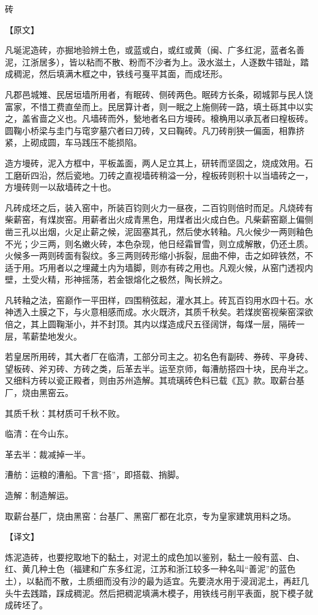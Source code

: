 \documentclass[12pt,UTF8]{ctexbook}
\begin{document}
砖

【原文】

凡埏泥造砖，亦掘地验辨土色，或蓝或白，或红或黄（闽、广多红泥，蓝者名善泥，江浙居多），皆以粘而不散、粉而不沙者为上。汲水滋土，人逐数牛错趾，踏成稠泥，然后填满木框之中，铁线弓戛平其面，而成坯形。

凡郡邑城雉、民居垣墙所用者，有眠砖、侧砖两色。眠砖方长条，砌城郭与民人饶富家，不惜工费直垒而上。民居算计者，则一眠之上施侧砖一路，填土砾其中以实之，盖省啬之义也。凡墙砖而外，甃地者名曰方墁砖。榱桷用以承瓦者曰楻板砖。圆鞠小桥梁与圭门与窀穸墓穴者曰刀砖，又曰鞠砖。凡刀砖削狭一偏面，相靠挤紧，上砌成圆，车马践压不能损陷。

造方墁砖，泥入方框中，平板盖面，两人足立其上，研转而坚固之，烧成效用。石工磨斫四沿，然后瓷地。刀砖之直视墙砖稍溢一分，楻板砖则积十以当墙砖之一，方墁砖则一以敌墙砖之十也。

凡砖成坯之后，装入窑中，所装百钧则火力一昼夜，二百钧则倍时而足。凡烧砖有柴薪窑，有煤炭窑。用薪者出火成青黑色，用煤者出火成白色。凡柴薪窑巅上偏侧凿三孔以出烟，火足止薪之候，泥固塞其孔，然后使水转釉。凡火候少一两则釉色不光；少三两，则名嫩火砖，本色杂现，他日经霜冒雪，则立成解散，仍还土质。火候多一两则砖面有裂纹。多三两则砖形缩小拆裂，屈曲不伸，击之如碎铁然，不适于用。巧用者以之埋藏土内为墙脚，则亦有砖之用也。凡观火候，从窑门透视内壁，土受火精，形神摇荡，若金银熔化之极然，陶长辨之。

凡转釉之法，窑巅作一平田样，四围稍弦起，灌水其上。砖瓦百钧用水四十石。水神透入土膜之下，与火意相感而成。水火既济，其质千秋矣。若煤炭窑视柴窑深欲倍之，其上圆鞠渐小，并不封顶。其内以煤造成尺五径阔饼，每煤一层，隔砖一层，苇薪垫地发火。

若皇居所用砖，其大者厂在临清，工部分司主之。初名色有副砖、券砖、平身砖、望板砖、斧刃砖、方砖之类，后革去半。运至京师，每漕舫搭四十块，民舟半之。又细料方砖以瓷正殿者，则由苏州造解。其琉璃砖色料已载《瓦》款。取薪台基厂，烧由黑窑云。

其质千秋：其材质可千秋不败。

临清：在今山东。

革去半：裁减掉一半。

漕舫：运粮的漕船。下言“搭”，即搭载、捎脚。

造解：制造解运。

取薪台基厂，烧由黑窑：台基厂、黑窑厂都在北京，专为皇家建筑用料之场。

【译文】

炼泥造砖，也要挖取地下的黏土，对泥土的成色加以鉴别，黏土一般有蓝、白、红、黄几种土色（福建和广东多红泥，江苏和浙江较多一种名叫“善泥”的蓝色土），以黏而不散，土质细而没有沙的最为适宜。先要浇水用于浸润泥土，再赶几头牛去践踏，踩成稠泥。然后把稠泥填满木模子，用铁线弓削平表面，脱下模子就成砖坯了。
\end{document}
